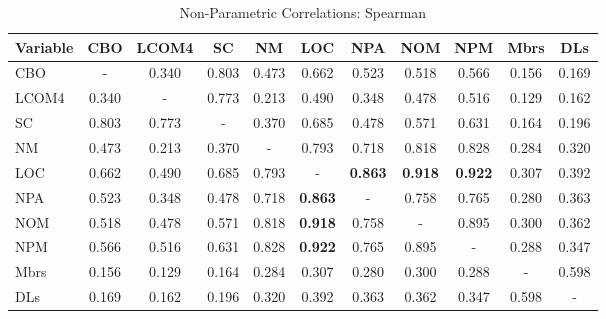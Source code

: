 \documentclass[conference]{IEEEtran}
\begin{document}
\begin{center}
\begin{table*}[bt]
\centering \caption{Non-Parametric Correlations: Spearman}
\begin{tabular}{|l|c|c|c|c|c|c|c|c|c|c|} \hline

\textbf{Variable} & CBO & LCOM4 & SC & NM & LOC & NPA & NOM & NPM & Mbrs & DLs
\\ \hline
CBO & - & 0.340 & 0.803 & 0.473 & 0.662 & 0.523 & 0.518 & 0.566 & 0.156 & 0.169
\\ \hline
LCOM4 & 0.340 & - & 0.773 & 0.213 & 0.490 & 0.348 & 0.478 & 0.516 & 0.129 & 0.162
\\ \hline
SC & 0.803 & 0.773 & - & 0.370 & 0.685 & 0.478 & 0.571 & 0.631 & 0.164 & 0.196
\\ \hline
NM & 0.473 & 0.213 & 0.370 & - & 0.793 & 0.718 & 0.818 & 0.828 & 0.284 & 0.320
\\ \hline
LOC & 0.662 & 0.490 & 0.685 & 0.793 & - & \textbf{0.863} & \textbf{0.918} & \textbf{0.922} & 0.307 & 0.392
\\ \hline
NPA & 0.523 & 0.348 & 0.478 & 0.718 & \textbf{0.863} & - & 0.758 & 0.765 & 0.280 & 0.363
\\ \hline
NOM & 0.518 & 0.478 & 0.571 & 0.818 & \textbf{0.918} & 0.758 & - & 0.895 & 0.300 & 0.362
\\ \hline
NPM & 0.566 & 0.516 & 0.631 & 0.828 & \textbf{0.922} & 0.765 & 0.895 & - & 0.288 & 0.347
\\ \hline
Mbrs & 0.156 & 0.129 & 0.164 & 0.284 & 0.307 & 0.280 & 0.300 & 0.288 & - & 0.598
\\ \hline
DLs & 0.169 & 0.162 & 0.196 & 0.320 & 0.392 & 0.363 & 0.362 & 0.347 & 0.598 & -
\\ \hline
\end{tabular}
\label{spearman}
\end{table*}
\end{center}
\end{document}
